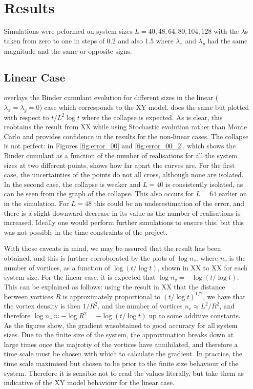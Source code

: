 \chapter{Results}

Simulations were peformed on system sizes $L=40, 48, 64, 80, 104, 128$ with the $\lambda$s taken from zero to one in steps of 0.2 and also 1.5 where $\lambda_x$ and $\lambda_y$ had the same magnitude and the same or opposite signs. 

\section{Linear Case}

\fig{\ref{fig:binder_t_00}} overlays the Binder cumulant evolution for different sizes in the linear ($\lambda_x = \lambda_y = 0$) case which corresponds to the XY model. \fig{\ref{fig:binder_logt_00}} does the same but plotted with respect to $t/L^2 \log t$ where the collapse is expected. As is clear, this reobtains the result from XX while using Stochastic evolution rather than Monte Carlo and provides confidence in the results for the non-linear cases. The collapse is not perfect: in Figures \ref{fig:error_00} and \ref{fig:error_00_2}, which shows the Binder cumulant as a function of the number of realisations for all the system sizes at two different points, shows how far apart the curves are. For the first case, the uncertainties of the points do not all cross, although none are isolated. In the second case, the collapse is weaker and $L=40$ is consistently isolated, as can be seen from the graph of the collapse. This also occurs for $L=64$ earlier on in the simulation. For $L=48$ this could be an underestimation of the error, and there is a slight downward decrease in its value as the number of realisations is increased. Ideally one would perform further simulations to ensure this, but this was not possible in the time constraints of the project. 

With those caveats in mind, we may be assured that the result has been obtained, and this is further corroborated by the plots of $\log n_v$, where $n_v$ is the number of vortices, as a function of $\log (t / \log t)$, shown in XX to XX for each system size. For the linear case, it is expected that $\log n_v = -\log (t / \log t)$. This can be explained as follows: using the result in XX that the distance between vortices $R$ is approximately proportional to $ (t / \log t)^{1/2}$, we have that the vortex density is then $1/R^2$, and the number of vortices $n_v \approx L^2/R^2$, and therefore $\log n_v \approx -  \log R^2 = -\log(t/\log t)$ up to some additive constants. As the figures show, the gradient wasobtained to good accuracy for all system sizes. Due to the finite size of the system, the approximation breaks down at large times once the majrotiy of the vortices have annihilated, and therefore a time scale must be chosen with which to calculate the gradient. In practice, the time scale maximised but chosen to be prior to the finite size behaviour of the system. Therefore it is sensible not to read the values literally, but take them as indicative of the XY model behaviour for the linear case.                

